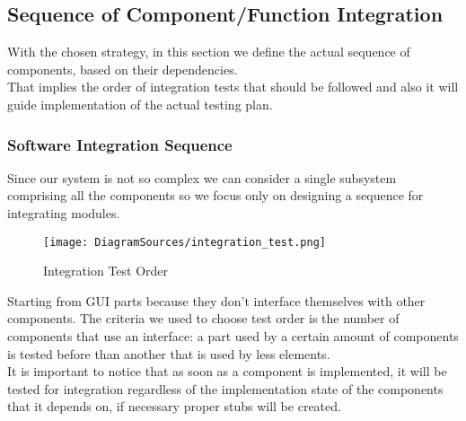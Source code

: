 \subsection{Sequence of Component/Function Integration}
With the chosen strategy, in this section we define the actual sequence of components, based on their dependencies.\\ 
That implies the order of integration tests that should be followed and also it will guide implementation of the actual testing plan. 
\subsubsection{Software Integration Sequence}
Since our system is not so complex we can consider a single subsystem comprising all the components so we focus only on designing a sequence for integrating modules.
\begin{figure}[H]
\centering
\texttt{[image: DiagramSources/integration\_test.png]}
\label{Figure 2:}\caption{ Integration Test Order}
\end{figure}
Starting from GUI parts because they don't interface themselves with other components. The criteria we used to choose test order is the number of components that use an interface: a part used by a certain amount of components is tested before than another that is used by less elements. \\
It is important to notice that as soon as a component is implemented, it will be tested for integration regardless of the implementation state of the components that it depends on, if necessary proper stubs will be created.